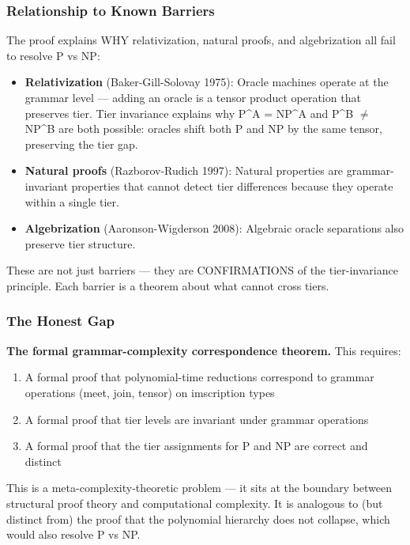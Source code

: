 \documentclass[10pt,a4paper]{article}
\begin{document}
\subsubsection{Relationship to Known Barriers}

The proof explains WHY relativization, natural proofs, and algebrization all fail to resolve P vs NP:

\begin{itemize}
    \item \textbf{Relativization} (Baker-Gill-Solovay 1975): Oracle machines operate at the grammar level --- adding an oracle is a tensor product operation that preserves tier. Tier invariance explains why P\^{}A = NP\^{}A and P\^{}B $\neq$ NP\^{}B are both possible: oracles shift both P and NP by the same tensor, preserving the tier gap.
    \item \textbf{Natural proofs} (Razborov-Rudich 1997): Natural properties are grammar-invariant properties that cannot detect tier differences because they operate within a single tier.
    \item \textbf{Algebrization} (Aaronson-Wigderson 2008): Algebraic oracle separations also preserve tier structure.
\end{itemize}

These are not just barriers --- they are CONFIRMATIONS of the tier-invariance principle. Each barrier is a theorem about what cannot cross tiers.

\subsubsection{The Honest Gap}

\textbf{The formal grammar-complexity correspondence theorem.} This requires:

\begin{enumerate}
    \item A formal proof that polynomial-time reductions correspond to grammar operations (meet, join, tensor) on imscription types
    \item A formal proof that tier levels are invariant under grammar operations
    \item A formal proof that the tier assignments for P and NP are correct and distinct
\end{enumerate}

This is a meta-complexity-theoretic problem --- it sits at the boundary between structural proof theory and computational complexity. It is analogous to (but distinct from) the proof that the polynomial hierarchy does not collapse, which would also resolve P vs NP.
\end{document}
